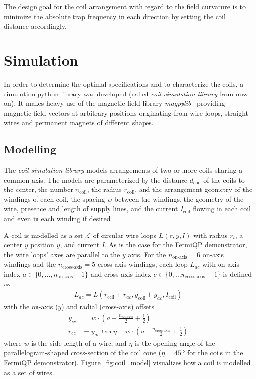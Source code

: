 The design goal for the coil arrangement with regard to the field curvature is to minimize the absolute trap frequency in each direction by setting the coil distance accordingly.

\section{Simulation}\label{ch:simulation}
In order to determine the optimal specifications and to characterize the coils, a simulation python library was developed (called \textit{coil simulation library} from now on). It makes heavy use of the magnetic field library \textit{magpylib}~\cite{ortner_magpylib_2020, noauthor_magpylibmagpylib_2022} providing magnetic field vectors at arbitrary positions originating from wire loops, straight wires and permanent magnets of different shapes.

\subsection*{Modelling}
The \textit{coil simulation library} models arrangements of two or more coils sharing a common axis. The models are parameterized by the distance $d_\text{coil}$ of the coils to the center, the number $n_\text{coil}$, the radius $r_\text{coil}$, and the arrangement geometry of the windings of each coil, the spacing $w$ between the windings, the geometry of the wire, presence and length of supply lines, and the current $I_\text{coil}$ flowing in each coil and even in each winding if desired.

A coil is modelled as a set $\mathcal{L}$ of circular wire loops $L(r, y, I)$ with radius $r_i$, a center $y$ position $y$, and current $I$. As is the case for the FermiQP demonstrator, the wire loops' axes are parallel to the $y$ axis. For the $n_\text{on-axis} = 6$ on-axis windings and the $n_\text{cross-axis} = 5$ cross-axis windings, each loop $L_{ac}$ with on-axis index $a \in \{0, \ldots, n_\text{on-axis} - 1\}$ and cross-axis index $c \in \{0, \ldots n_\text{cross-axis} - 1\}$ is defined as
\begin{align}
    L_{ac} = L \left(r_\text{coil} + r_{ac}, y_\text{coil} + y_{ac}, I_\text{coil}\right)
\end{align}
with the on-axis ($y$) and radial (cross-axis) offsets
\begin{align}
    y_{ac} &= w\cdot \left(a-\frac{n_\text{on-axis}}{2} + \frac{1}{2}\right) \\
    r_{ac} &= y_{ac} \tan \eta + w \cdot \left(c - \frac{n_\text{cross-axis}}{2} + \frac{1}{2}\right)
\end{align}
where $w$ is the side length of a wire, and $\eta$ is the opening angle of the parallelogram-shaped cross-section of the coil cone ($\eta = \SI{45}{\degree}$ for the coils in the FermiQP demonstrator). Figure~\ref{fig:coil_model} visualizes how a coil is modelled as a set of wires.


